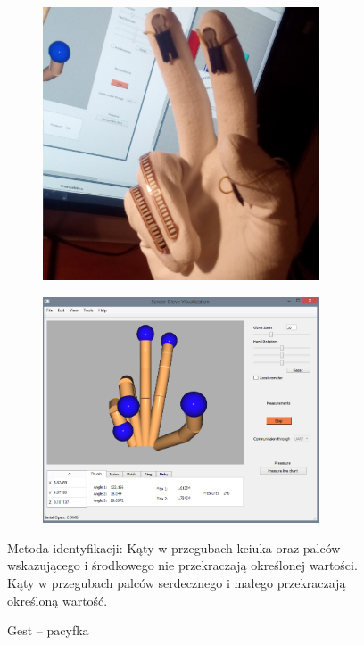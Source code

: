 \documentclass[12pt,a4paper]{article}
\begin{document}
\begin{figure}[!htb]
\centering
    \begin{subfigure}{.5\textwidth}
      \includegraphics[width=0.9\textwidth]{./images/Peace.jpg}
     \end{subfigure}%
    \begin{subfigure}{.5\textwidth}
      \includegraphics[width=0.9\textwidth]{./images/PeaceQt.png}
     \end{subfigure}
    \caption{Gest -- pacyfka\label{fig:Peace}}
\flushleft Metoda identyfikacji: Kąty w przegubach kciuka oraz palców wskazującego i środkowego nie przekraczają określonej wartości. Kąty w przegubach palców serdecznego i małego przekraczają określoną wartość.
\end{figure}
\end{document}
